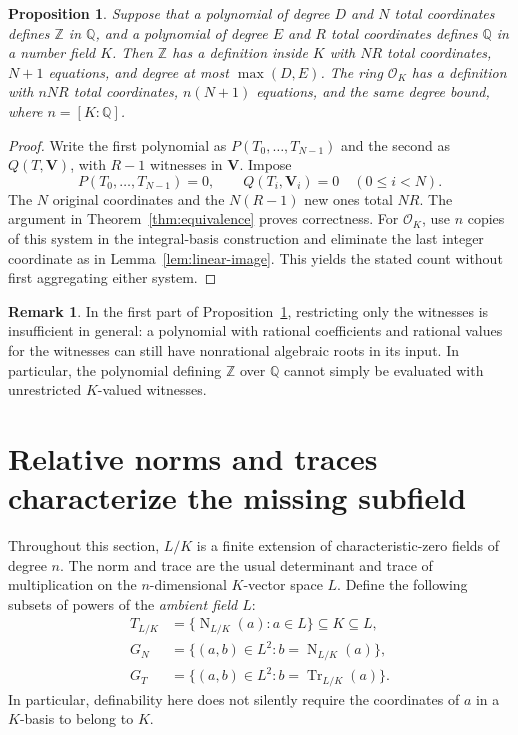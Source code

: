 \documentclass[11pt,a4paper]{article}
\newtheorem{proposition}[theorem]{Proposition}
\theoremstyle{definition}
\newtheorem{remark}[theorem]{Remark}
\newcommand{\Q}{\mathbb Q}
\newcommand{\Z}{\mathbb Z}
\newcommand{\OK}{\mathcal O_K}
\newcommand{\Tr}{\operatorname{Tr}}
\newcommand{\Nm}{\operatorname{N}}
\begin{document}
\begin{proposition}\label{prop:composition-count}
Suppose that a polynomial of degree $D$ and $N$ total coordinates
defines $\Z$ in $\Q$, and a polynomial of degree $E$ and $R$ total
coordinates defines $\Q$ in a number field $K$.
Then $\Z$ has a definition inside $K$ with $NR$ total coordinates,
$N+1$ equations, and degree at most $\max(D,E)$.
The ring $\OK$ has a definition with $nNR$ total coordinates,
$n(N+1)$ equations, and the same degree bound, where $n=[K:\Q]$.
\end{proposition}
\begin{proof}
Write the first polynomial as $P(T_0,\ldots,T_{N-1})$ and the
second as $Q(T,\mathbf V)$, with $R-1$ witnesses in $\mathbf V$.
Impose
\[
 P(T_0,\ldots,T_{N-1})=0,\qquad
 Q(T_i,\mathbf V_i)=0\quad(0\le i<N).
\]
The $N$ original coordinates and the $N(R-1)$ new ones total $NR$.
The argument in Theorem~\ref{thm:equivalence} proves correctness.
For $\OK$, use $n$ copies of this system in the integral-basis
construction and eliminate the last integer coordinate as in
Lemma~\ref{lem:linear-image}. This yields the stated count without
first aggregating either system.
\end{proof}

\begin{remark}
In the first part of Proposition~\ref{prop:composition-count},
restricting only the witnesses is insufficient in general: a
polynomial with rational coefficients and rational values for the
witnesses can still have nonrational algebraic roots in its input.
In particular, the polynomial defining $\Z$ over $\Q$ cannot simply
be evaluated with unrestricted $K$-valued witnesses.
\end{remark}

\section{Relative norms and traces characterize the missing subfield}

Throughout this section, $L/K$ is a finite extension of
characteristic-zero fields of degree $n$. The norm and trace are
the usual determinant and trace of multiplication on the
$n$-dimensional $K$-vector space $L$. Define the following subsets
of powers of the \emph{ambient field $L$}:
\[
\begin{split}
 T_{L/K}&=\{\Nm_{L/K}(a):a\in L\}\subseteq K\subseteq L,\\
 G_N&=\{(a,b)\in L^2:b=\Nm_{L/K}(a)\},\\
 G_T&=\{(a,b)\in L^2:b=\Tr_{L/K}(a)\}.
\end{split}
\]
In particular, definability here does not silently require the
coordinates of $a$ in a $K$-basis to belong to $K$.
\end{document}
